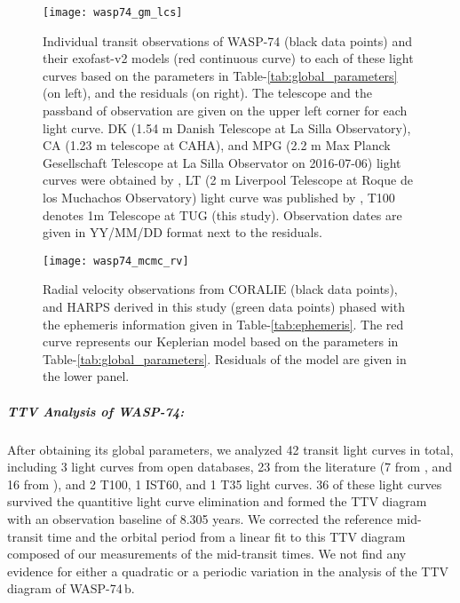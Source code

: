 \documentclass[a4paper,fleqn,usenatbib]{mnras}
\begin{document}
\begin{figure}
\texttt{[image: wasp74\_gm\_lcs]}
\caption{Individual transit observations of WASP-74 (black data points) and their {\sc exofast}-v2 models (red continuous curve) to each of these light curves based on the parameters in Table-\ref{tab:global_parameters} (on left), and the residuals (on right). The telescope and the passband of observation are given on the upper left corner for each light curve. DK (1.54 m Danish Telescope at La Silla Observatory), CA (1.23 m telescope at CAHA), and MPG (2.2 m Max Planck Gesellschaft Telescope at La Silla Observator on 2016-07-06) light curves were obtained by \citet{2019MNRAS.485.5168M}, LT (2 m Liverpool Telescope at Roque de los Muchachos Observatory) light curve was published by \citet{2015AJ....150...18H}, T100 denotes 1m Telescope at TUG (this study). Observation dates are given in YY/MM/DD format next to the residuals.}

  
    \label{fig:wasp74_mcmc_transits}
\end{figure}

\begin{figure}
\texttt{[image: wasp74\_mcmc\_rv]}
\caption{Radial velocity observations from CORALIE \citep{2015AJ....150...18H} (black data points), and HARPS derived in this study (green data points) phased with the ephemeris information given in Table-\ref{tab:ephemeris}. The red curve represents our Keplerian model based on the parameters in Table-\ref{tab:global_parameters}. Residuals of the model are given in the lower panel.}
    \label{fig:wasp74_mcmc_rv}
\end{figure}

\subparagraph{TTV Analysis of WASP-74: } After obtaining its global parameters, we analyzed 42 transit light curves in total, including 3 light curves from open databases, 23 from the literature (7 from \cite{2015AJ....150...18H}, and 16 from \cite{2019MNRAS.485.5168M}), and 2 T100, 1 IST60, and 1 T35 light curves. 36 of these light curves survived the quantitive light curve elimination and formed the TTV diagram with an observation baseline of 8.305 years. We corrected the reference mid-transit time and the orbital period from a linear fit to this TTV diagram composed of our measurements of the mid-transit times. We not find any evidence for either a quadratic or a periodic variation in the analysis of the TTV diagram of WASP-74\,b.
\end{document}
